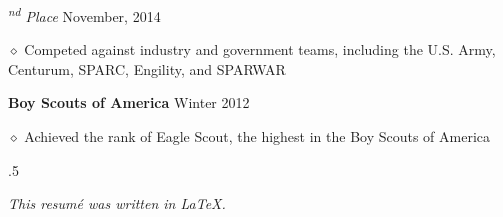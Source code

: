 \documentclass[executivepaper]{extarticle}
\begin{document}
\begin{center}
{\begin{minipage}{7.0in}
{\noindent \textit{\fontsize{12}{8}\textsuperscript{nd} Place}} {\hfill \fontsize{10}{8}\selectfont November, 2014}

\vspace{0.25mm}

{\noindent $\diamond$ {\fontsize{12}{8}\selectfont Competed against industry and government teams, including the U.S. Army, Centurum, SPARC, Engility, and SPARWAR}}

\vspace{2mm}

{\noindent \textbf{\fontsize{12}{8}\selectfont Boy Scouts of America}} {\hfill \fontsize{10}{8}\selectfont Winter 2012}

\vspace{0.25mm}

{\noindent $\diamond$ {\fontsize{12}{8}\selectfont Achieved the rank of Eagle Scout, the highest in the Boy Scouts of America}}

\vspace{5mm}



\moveleft.5\hoffset\centerline{{\large\sl This resumé was written in \LaTeX.}}

\end{minipage}

}

\end{center}
\end{document}
